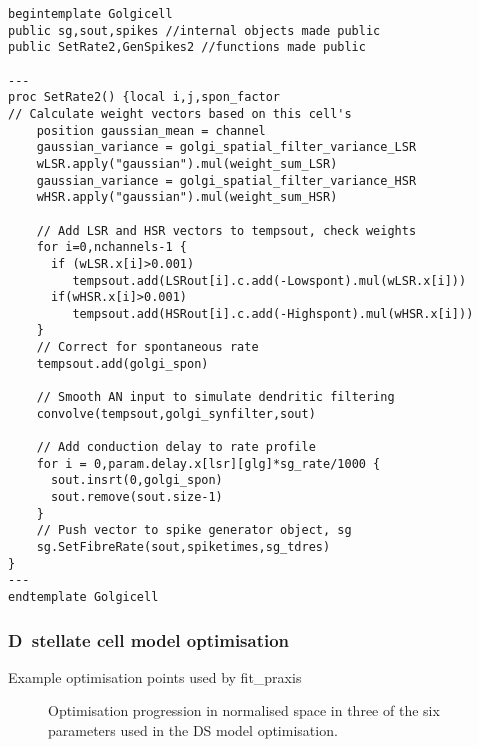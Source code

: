 


\begin{lstlisting}[label=lst:GolgiTemplate,caption=Rate-based golgi cell model
  template (in par\_CNcell.tem)]
begintemplate Golgicell
public sg,sout,spikes //internal objects made public
public SetRate2,GenSpikes2 //functions made public

---
proc SetRate2() {local i,j,spon_factor
// Calculate weight vectors based on this cell's
    position gaussian_mean = channel
    gaussian_variance = golgi_spatial_filter_variance_LSR
    wLSR.apply("gaussian").mul(weight_sum_LSR)
    gaussian_variance = golgi_spatial_filter_variance_HSR
    wHSR.apply("gaussian").mul(weight_sum_HSR)

    // Add LSR and HSR vectors to tempsout, check weights
    for i=0,nchannels-1 {
      if (wLSR.x[i]>0.001)
         tempsout.add(LSRout[i].c.add(-Lowspont).mul(wLSR.x[i]))
      if(wHSR.x[i]>0.001)
         tempsout.add(HSRout[i].c.add(-Highspont).mul(wHSR.x[i]))
    }
    // Correct for spontaneous rate
    tempsout.add(golgi_spon)

    // Smooth AN input to simulate dendritic filtering
    convolve(tempsout,golgi_synfilter,sout)

    // Add conduction delay to rate profile
    for i = 0,param.delay.x[lsr][glg]*sg_rate/1000 {
      sout.insrt(0,golgi_spon)
      sout.remove(sout.size-1)
    }
    // Push vector to spike generator object, sg
    sg.SetFibreRate(sout,spiketimes,sg_tdres)
}
---
endtemplate Golgicell

\end{lstlisting}



\subsubsection[D~stellate cell model]{D~stellate cell model optimisation}    \label{sec:APDX:d-stellate-cell}

Example optimisation points used by \textsf{fit\_praxis}
\begin{figure}[htb]
  \centering
  \caption[Parameter searching in PRAXIS]{Optimisation progression in normalised space in three of the six
    parameters used in the DS model optimisation.} \label{fig:praxis}
\end{figure}


